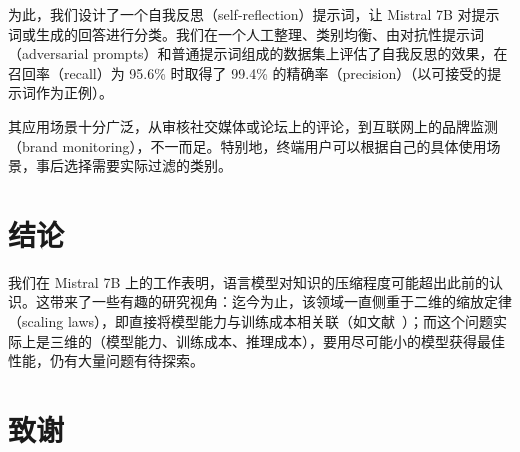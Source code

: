 \documentclass[a4paper,11pt]{article}
\providecommand{\bipar}[2]{#2}
\providecommand{\bihead}[2]{#2}
\providecommand{\bisection}[2]{\section{#2}}
\begin{document}
\bipar{To do so, we designed a self-reflection prompt that makes Mistral 7B classify a prompt or a generated answer. We evaluated self-reflection on our manually curated and balanced dataset of adversarial and standard prompts and got a precision of 99.4\% for a recall of 95.6\% (considering acceptable prompts as positives).}{为此，我们设计了一个自我反思（self-reflection）提示词，让 Mistral 7B 对提示词或生成的回答进行分类。我们在一个人工整理、类别均衡、由对抗性提示词（adversarial prompts）和普通提示词组成的数据集上评估了自我反思的效果，在召回率（recall）为 95.6\% 时取得了 99.4\% 的精确率（precision）（以可接受的提示词作为正例）。}

\bipar{The use cases are vast, from moderating comments on social media or forums to brand monitoring on the internet. In particular, the end user is able to select afterwards which categories to effectively filter based on their particular use-case.}{其应用场景十分广泛，从审核社交媒体或论坛上的评论，到互联网上的品牌监测（brand monitoring），不一而足。特别地，终端用户可以根据自己的具体使用场景，事后选择需要实际过滤的类别。}

\bisection{Conclusion}{结论}
\label{sec:conclusion}

\bipar{Our work on Mistral 7B demonstrates that language models may compress knowledge more than what was previously thought. This opens up interesting perspectives: the field has so far put the emphasis on scaling laws in 2 dimensions (directly associating model capabilities to training cost, as in \cite{ref14}); the problem is rather 3 dimensional (model capabilities, training cost, inference cost), and much remains to be explored to obtain the best performance with the smallest possible model.}{我们在 Mistral 7B 上的工作表明，语言模型对知识的压缩程度可能超出此前的认识。这带来了一些有趣的研究视角：迄今为止，该领域一直侧重于二维的缩放定律（scaling laws），即直接将模型能力与训练成本相关联（如文献~\cite{ref14}）；而这个问题实际上是三维的（模型能力、训练成本、推理成本），要用尽可能小的模型获得最佳性能，仍有大量问题有待探索。}

\section*{\bihead{Acknowledgements}{致谢}}
\end{document}
